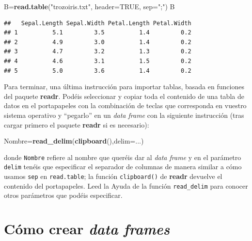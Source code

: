 \documentclass[]{book}
\newenvironment{Shaded}{\begin{snugshade}}{\end{snugshade}}
\newcommand{\DataTypeTok}[1]{\textcolor[rgb]{0.13,0.29,0.53}{#1}}
\newcommand{\KeywordTok}[1]{\textcolor[rgb]{0.13,0.29,0.53}{\textbf{#1}}}
\newcommand{\NormalTok}[1]{#1}
\newcommand{\OtherTok}[1]{\textcolor[rgb]{0.56,0.35,0.01}{#1}}
\newcommand{\StringTok}[1]{\textcolor[rgb]{0.31,0.60,0.02}{#1}}
\theoremstyle{definition}
\theoremstyle{definition}
\theoremstyle{definition}
\theoremstyle{remark}
\begin{document}
\begin{Shaded}
\begin{Highlighting}[]
\NormalTok{B=}\KeywordTok{read.table}\NormalTok{(}\StringTok{"trozoiris.txt"}\NormalTok{, }\DataTypeTok{header=}\OtherTok{TRUE}\NormalTok{, }\DataTypeTok{sep=}\StringTok{";"}\NormalTok{)}
\NormalTok{B}
\end{Highlighting}
\end{Shaded}

\begin{verbatim}
##   Sepal.Length Sepal.Width Petal.Length Petal.Width
## 1          5.1         3.5          1.4         0.2
## 2          4.9         3.0          1.4         0.2
## 3          4.7         3.2          1.3         0.2
## 4          4.6         3.1          1.5         0.2
## 5          5.0         3.6          1.4         0.2
\end{verbatim}

Para terminar, una última instrucción para importar tablas, basada en funciones del paquete \textbf{readr}. Podéis seleccionar y copiar toda el contenido de una tabla de datos en el portapapeles con la combinación de teclas que corresponda en vuestro sistema operativo y ``pegarlo'' en un \emph{data frame} con la siguiente instrucción (tras cargar primero el paquete \textbf{readr} si es necesario):

\begin{Shaded}
\begin{Highlighting}[]
\NormalTok{Nombre=}\KeywordTok{read_delim}\NormalTok{(}\KeywordTok{clipboard}\NormalTok{(),}\DataTypeTok{delim=}\NormalTok{...)}
\end{Highlighting}
\end{Shaded}

donde \texttt{Nombre} refiere al nombre que queréis dar al \emph{data frame} y en el parámetro \texttt{delim} tenéis que especificar el separador de columnas de manera similar a cómo usamos \texttt{sep} en \texttt{read.table}; la función \texttt{clipboard()} de \textbf{readr} devuelve el contenido del portapapeles. Leed la Ayuda de la función \texttt{read\_delim} para conocer otros parámetros que podéis especificar.

\hypertarget{como-crear-data-frames}{%
\section{\texorpdfstring{Cómo crear \emph{data frames}}{Cómo crear data frames}}\label{como-crear-data-frames}}
\end{document}
